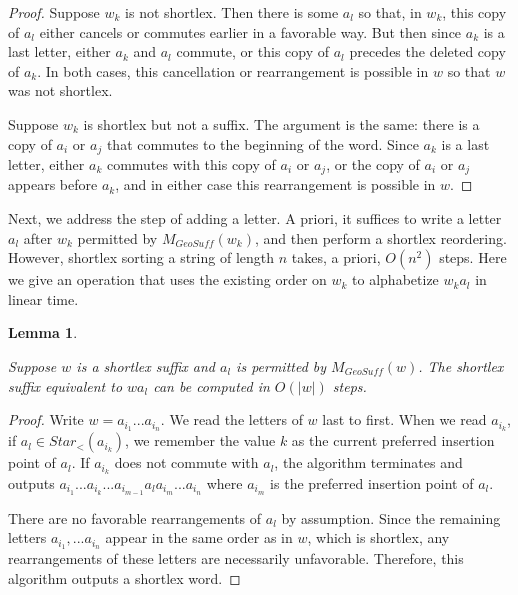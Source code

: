 \documentclass[10pt,a4paper]{amsart}
\newtheorem{lemma}[theorem]{Lemma}
\theoremstyle{definition}
\theoremstyle{remark}
\begin{document}
	\begin{proof}
		
		Suppose $w_k$ is not shortlex. Then there is some $a_l$ so that, in $w_k$, this copy of $a_l$ either cancels or commutes earlier in a favorable way. But then since $a_k$ is a last letter, either $a_k$ and $a_l$ commute, or this copy of $a_l$ precedes the deleted copy of $a_k$. In both cases, this cancellation or rearrangement is possible in $w$ so that $w$ was not shortlex.
		
		Suppose $w_k$ is shortlex but not a suffix. The argument is the same: there is a copy of $a_i$ or $a_j$ that commutes to the beginning of the word. Since $a_k$ is a last letter, either $a_k$ commutes with this copy of $a_i$ or $a_j$, or the copy of $a_i$ or $a_j$ appears before $a_k$, and in either case this rearrangement is possible in $w$.
	\end{proof}
	
	Next, we address the step of adding a letter. A priori, it suffices to write a letter $a_l$ after $w_k$ permitted by $M_{GeoSuff}(w_k)$, and then perform a shortlex reordering. However, shortlex sorting a string of length $n$ takes, a priori, $O(n^2)$ steps. Here we give an operation that uses the existing order on $w_k$ to alphabetize $w_ka_l$ in linear time.
	
	\begin{lemma}\label{ShortlexInsertion}
		
		Suppose $w$ is a shortlex suffix and $a_l$ is permitted by $M_{GeoSuff}(w)$. The shortlex suffix equivalent to $wa_l$ can be computed in $O(|w|)$ steps.
		
	\end{lemma}
	
	\begin{proof}
		
		Write $w=a_{i_1}...a_{i_n}$. We read the letters of $w$ last to first. When we read $a_{i_k}$, if \newline $a_l\in Star_<(a_{i_k})$, we remember the value $k$ as the current preferred insertion point of $a_l$. If $a_{i_k}$ does not commute with $a_l$, the algorithm terminates and outputs $a_{i_1}...a_{i_k}...a_{i_{m-1}}a_la_{i_m}...a_{i_n}$ where $a_{i_m}$ is the preferred insertion point of $a_l$.
		
		There are no favorable rearrangements of $a_l$ by assumption. Since the remaining letters $a_{i_1},...a_{i_n}$ appear in the same order as in $w$, which is shortlex, any rearrangements of these letters are necessarily unfavorable. Therefore, this algorithm outputs a shortlex word.
	\end{proof}
	
\end{document}
